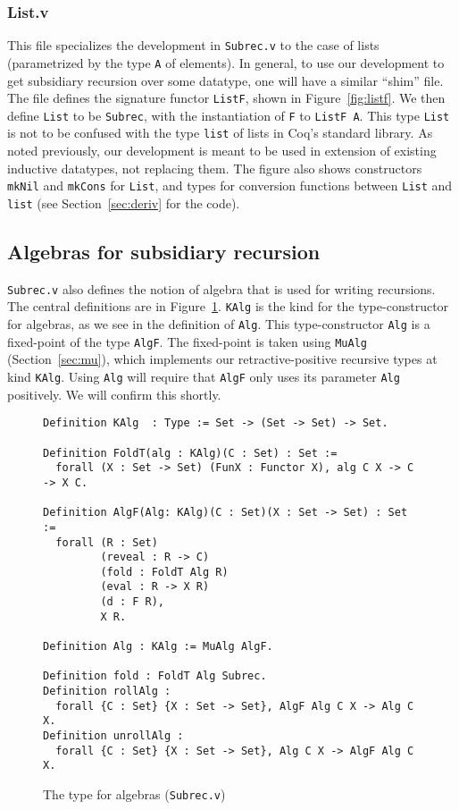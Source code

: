 \documentclass[a4paper,USenglish]{lipics-v2021}
\begin{document}
  \subsubsection{List.v}

  This file specializes the development in \verb|Subrec.v| to the case
  of lists (parametrized by the type \verb|A| of elements).  In
  general, to use our development to get subsidiary recursion over
  some datatype, one will have a similar ``shim'' file.  The file
  defines the signature functor \verb|ListF|, shown in
  Figure~\ref{fig:listf}.  We then define \verb|List| to be
  \verb|Subrec|, with the instantiation of \verb|F| to \verb|ListF A|.
  This type \verb|List| is not to be confused with the type
  \verb|list| of lists in Coq's standard library.  As noted
  previously, our development is meant to be used in extension of
  existing inductive datatypes, not replacing them.  The figure also
  shows constructors \verb|mkNil| and \verb|mkCons| for \verb|List|,
  and types for conversion functions between \verb|List| and
  \verb|list| (see Section~\ref{sec:deriv} for the code).
  

\subsection{Algebras for subsidiary recursion}

\verb|Subrec.v| also defines the notion of algebra that is used for
writing recursions.  The central definitions are in
Figure~\ref{fig:algf}.  \verb|KAlg| is the kind for the
type-constructor for algebras, as we see in the definition of
\verb|Alg|.  This type-constructor \verb|Alg| is a fixed-point of the
type \verb|AlgF|.  The fixed-point is taken using \verb|MuAlg|
(Section~\ref{sec:mu}), which implements our retractive-positive
recursive types at kind \verb|KAlg|.  Using \verb|Alg| will require
that \verb|AlgF| only uses its parameter \verb|Alg| positively.  We
will confirm this shortly.

\begin{figure}
\begin{verbatim}
Definition KAlg  : Type := Set -> (Set -> Set) -> Set.

Definition FoldT(alg : KAlg)(C : Set) : Set :=
  forall (X : Set -> Set) (FunX : Functor X), alg C X -> C -> X C.

Definition AlgF(Alg: KAlg)(C : Set)(X : Set -> Set) : Set :=
  forall (R : Set)
         (reveal : R -> C)        
         (fold : FoldT Alg R)
         (eval : R -> X R)      
         (d : F R),             
         X R.

Definition Alg : KAlg := MuAlg AlgF.

Definition fold : FoldT Alg Subrec.
Definition rollAlg :
  forall {C : Set} {X : Set -> Set}, AlgF Alg C X -> Alg C X.
Definition unrollAlg : 
  forall {C : Set} {X : Set -> Set}, Alg C X -> AlgF Alg C X.
\end{verbatim}
\caption{The type for algebras (\texttt{Subrec.v})}
\label{fig:algf}
\end{figure}
\end{document}
